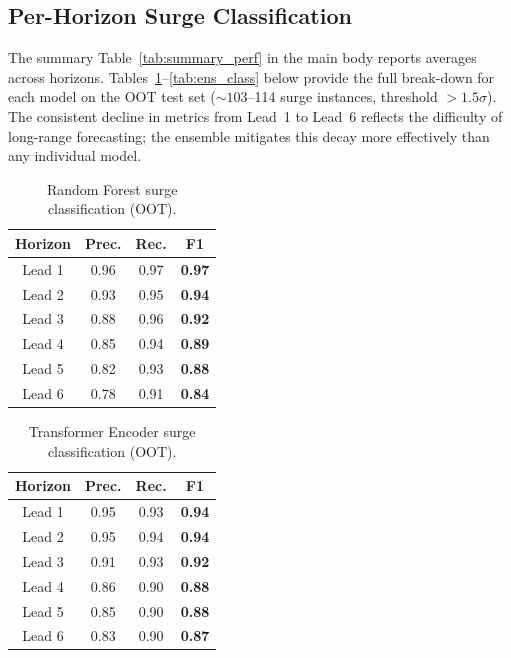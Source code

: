 \documentclass[11pt, a4paper]{article}
\begin{document}
\newpage
\begin{appendices}

\section{Per-Horizon Surge Classification}\label{app:perhorizon}

The summary Table~\ref{tab:summary_perf} in the main body reports averages across
horizons.  Tables~\ref{tab:rf_class}--\ref{tab:ens_class} below provide the full
break-down for each model on the OOT test set (${{\sim}103}$--114 surge instances,
threshold $> 1.5\sigma$).  The consistent decline in metrics from Lead~1 to Lead~6
reflects the difficulty of long-range forecasting; the ensemble mitigates this decay
more effectively than any individual model.

\begin{table}[ht]
  \centering
  \caption{Random Forest surge classification (OOT).}
  \label{tab:rf_class}
  \small
  \begin{tabular}{c c c c}
    \toprule
    \textbf{Horizon} & \textbf{Prec.} & \textbf{Rec.} & \textbf{F1} \\
    \midrule
    Lead 1 & 0.96 & 0.97 & \textbf{0.97} \\
    Lead 2 & 0.93 & 0.95 & \textbf{0.94} \\
    Lead 3 & 0.88 & 0.96 & \textbf{0.92} \\
    Lead 4 & 0.85 & 0.94 & \textbf{0.89} \\
    Lead 5 & 0.82 & 0.93 & \textbf{0.88} \\
    Lead 6 & 0.78 & 0.91 & \textbf{0.84} \\
    \bottomrule
  \end{tabular}
\end{table}

\begin{table}[ht]
  \centering
  \caption{Transformer Encoder surge classification (OOT).}
  \label{tab:trans_class}
  \small
  \begin{tabular}{c c c c}
    \toprule
    \textbf{Horizon} & \textbf{Prec.} & \textbf{Rec.} & \textbf{F1} \\
    \midrule
    Lead 1 & 0.95 & 0.93 & \textbf{0.94} \\
    Lead 2 & 0.95 & 0.94 & \textbf{0.94} \\
    Lead 3 & 0.91 & 0.93 & \textbf{0.92} \\
    Lead 4 & 0.86 & 0.90 & \textbf{0.88} \\
    Lead 5 & 0.85 & 0.90 & \textbf{0.88} \\
    Lead 6 & 0.83 & 0.90 & \textbf{0.87} \\
    \bottomrule
  \end{tabular}
\end{table}


\end{appendices}
\end{document}
